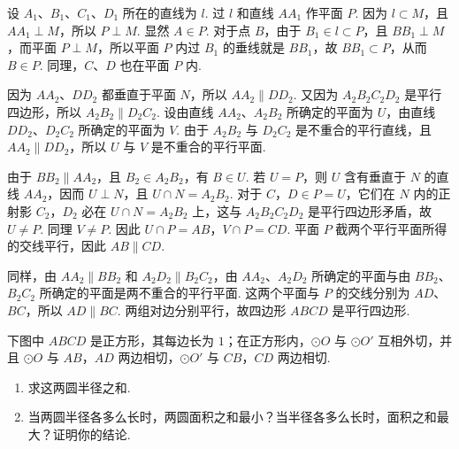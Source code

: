 \begin{solution}
设 \(A_1\)、\(B_1\)、\(C_1\)、\(D_1\) 所在的直线为 \(l\). 过 \(l\) 和直线 \(AA_1\) 作平面 \(P\). 因为 \(l\subset M\)，且 \(AA_1\perp M\)，所以 \(P\perp M\). 显然 \(A\in P\). 对于点 \(B\)，由于 \(B_1\in l\subset P\)，且 \(BB_1\perp M\)，而平面 \(P\perp M\)，所以平面 \(P\) 内过 \(B_1\) 的垂线就是 \(BB_1\)，故 \(BB_1\subset P\)，从而 \(B\in P\). 同理，\(C\)、\(D\) 也在平面 \(P\) 内.


因为 \(AA_2\)、\(DD_2\) 都垂直于平面 \(N\)，所以 \(AA_2\parallel DD_2\). 又因为 \(A_2B_2C_2D_2\) 是平行四边形，所以 \(A_2B_2\parallel D_2C_2\). 设由直线 \(AA_2\)、\(A_2B_2\) 所确定的平面为 \(U\)，由直线 \(DD_2\)、\(D_2C_2\) 所确定的平面为 \(V\). 由于 \(A_2B_2\) 与 \(D_2C_2\) 是不重合的平行直线，且 \(AA_2\parallel DD_2\)，所以 \(U\) 与 \(V\) 是不重合的平行平面.

由于 \(BB_2\parallel AA_2\)，且 \(B_2\in A_2B_2\)，有 \(B\in U\). 若 \(U=P\)，则 \(U\) 含有垂直于 \(N\) 的直线 \(AA_2\)，因而 \(U\perp N\)，且 \(U\cap N=A_2B_2\). 对于 \(C\)，\(D\in P=U\)，它们在 \(N\) 内的正射影 \(C_2\)，\(D_2\) 必在 \(U\cap N=A_2B_2\) 上，这与 \(A_2B_2C_2D_2\) 是平行四边形矛盾，故 \(U\ne P\). 同理 \(V\ne P\). 因此 \(U\cap P=AB\)，\(V\cap P=CD\). 平面 \(P\) 截两个平行平面所得的交线平行，因此 \(AB\parallel CD\).

同样，由 \(AA_2\parallel BB_2\) 和 \(A_2D_2\parallel B_2C_2\)，由 \(AA_2\)、\(A_2D_2\) 所确定的平面与由 \(BB_2\)、\(B_2C_2\) 所确定的平面是两不重合的平行平面. 这两个平面与 \(P\) 的交线分别为 \(AD\)、\(BC\)，所以 \(AD\parallel BC\). 两组对边分别平行，故四边形 \(ABCD\) 是平行四边形.
\end{solution}

\begin{problem}
下图中 \(ABCD\) 是正方形，其每边长为 \(1\)；在正方形内，\(\odot O\) 与 \(\odot O'\) 互相外切，并且 \(\odot O\) 与 \(AB\)，\(AD\) 两边相切，\(\odot O'\) 与 \(CB\)，\(CD\) 两边相切.

\begin{enumerate}
\item 求这两圆半径之和.
\item 当两圆半径各多么长时，两圆面积之和最小？当半径各多么长时，面积之和最大？证明你的结论.
\end{enumerate}

\end{problem}


